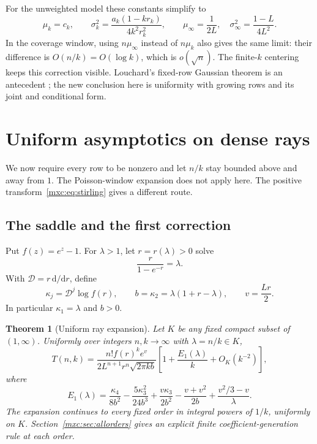 \documentclass[11pt]{article}
\numberwithin{equation}{section}
\newtheorem{theorem}{Theorem}[section]
\theoremstyle{definition}
\theoremstyle{remark}
\begin{document}
For the unweighted model these constants simplify to
\begin{equation}\label{mxc:eq:unweighted-clt}
 \mu_k=c_k,\qquad
 \sigma_k^2=\frac{a_k(1-kr_k)}{4k^2r_k^2},\qquad
 \mu_\infty=\frac1{2L},\quad
 \sigma_\infty^2=\frac{1-L}{4L^2}.
\end{equation}
In the coverage window, using $n\mu_\infty$ instead of $n\mu_k$
also gives the same limit: their difference is $O(n/k)=O(\log k)$,
which is $o(\sqrt n)$. The finite-$k$ centering keeps this correction
visible. Louchard's fixed-row Gaussian theorem is an antecedent
\cite{louchard}; the new conclusion here is uniformity with growing
rows and its joint and conditional form.

\section{Uniform asymptotics on dense rays}\label{mxc:sec:dense}

We now require every row to be nonzero and let $n/k$ stay bounded above
and away from $1$. The Poisson-window expansion does not apply here.
The positive transform~\eqref{mxc:eq:stirling} gives a different route.

\subsection{The saddle and the first correction}
Put $f(z)=e^z-1$. For $\lambda>1$, let $r=r(\lambda)>0$ solve
\begin{equation}\label{mxc:eq:dense-saddle}
 \frac{r}{1-e^{-r}}=\lambda.
\end{equation}
With $\mathcal D=r\,\mathrm d/\mathrm dr$, define
\begin{equation}\label{mxc:eq:cumulants}
 \kappa_j=\mathcal D^j\log f(r),\qquad
 b=\kappa_2=\lambda(1+r-\lambda),\qquad v=\frac{Lr}{2}.
\end{equation}
In particular $\kappa_1=\lambda$ and $b>0$.

\begin{theorem}[Uniform ray expansion]\label{mxc:thm:dense}
Let $K$ be any fixed compact subset of $(1,\infty)$. Uniformly over
integers $n,k\to\infty$ with $\lambda=n/k\in K$,
\begin{equation}\label{mxc:eq:dense-main}
 T(n,k)=\frac{n! f(r)^k e^v}
   {2L^{n+1}r^n\sqrt{2\pi k b}}
 \left[1+\frac{E_1(\lambda)}{k}+O_K(k^{-2})\right],
\end{equation}
where
\begin{equation}\label{mxc:eq:dense-correction}
 E_1(\lambda)=\frac{\kappa_4}{8b^2}
 -\frac{5\kappa_3^2}{24b^3}
 +\frac{v\kappa_3}{2b^2}
 -\frac{v+v^2}{2b}
 +\frac{v^2/3-v}{\lambda}.
\end{equation}
The expansion continues to every fixed order in integral powers of
$1/k$, uniformly on $K$. Section~\ref{mxc:sec:allorders} gives an explicit
finite coefficient-generation rule at each order.
\end{theorem}
\end{document}
